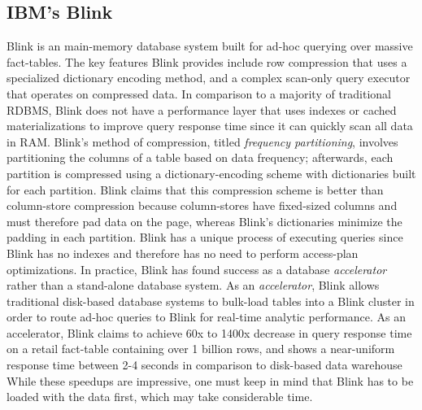 \documentclass[11pt,a4paper]{report}
\begin{document}
\subsection{IBM's Blink}
Blink is an main-memory database system built for ad-hoc querying over massive fact-tables.\cite{inablink} The key features Blink provides include row compression that uses a specialized dictionary encoding method, and a complex scan-only query executor that operates on compressed data. In comparison to a majority of traditional RDBMS, Blink does not have a performance layer that uses indexes or cached materializations to improve query response time since it can quickly scan all data in RAM. Blink's method of compression, titled \textit{frequency partitioning}, involves partitioning the columns of a table based on data frequency; afterwards, each partition is compressed using a dictionary-encoding scheme with dictionaries built for each partition. \cite{inablink} Blink claims that this compression scheme is better than column-store compression because column-stores have fixed-sized columns and must therefore pad data on the page, whereas Blink's dictionaries minimize the padding in each partition.\cite{inablink} Blink has a unique process of executing queries since Blink has no indexes and therefore has no need to perform access-plan optimizations. \cite{inablink} In practice, Blink has found success as a database \textit{accelerator} rather than a stand-alone database system. \cite{inablink} As an \textit{accelerator}, Blink allows traditional disk-based database systems to bulk-load tables into a Blink cluster in order to route ad-hoc queries to Blink for real-time analytic performance. \cite{inablink} As an accelerator, Blink claims to achieve 60x to 1400x decrease in query response time on a retail fact-table containing over 1 billion rows, and shows a near-uniform response time between 2-4 seconds in comparison to disk-based data warehouse \cite{inablink} While these speedups are impressive, one must keep in mind that Blink has to be loaded with the data first, which may take considerable time.
\end{document}
